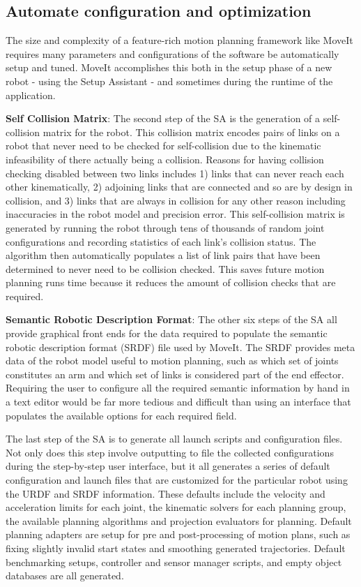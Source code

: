 \documentclass[10pt,journal,compsoc]{joser1}
\begin{document}
{\subsection{Automate configuration and optimization}

The size and complexity of a feature-rich motion planning framework like MoveIt requires many parameters and configurations of the software be automatically setup and tuned. MoveIt accomplishes this both in the setup phase of a new robot - using the Setup Assistant - and sometimes during the runtime of the application.

{\bf Self Collision Matrix}: The second step of the SA is the generation of a self-collision matrix for the robot. This collision matrix encodes pairs of links on a robot that never need to be checked for self-collision due to the kinematic infeasibility of there actually being a collision. Reasons for having collision checking disabled between two links includes 1) links that can never reach each other kinematically, 2) adjoining links that are connected and so are by design in collision, and 3) links that are always in collision for any other reason including inaccuracies in the robot model and precision error. This self-collision matrix is generated by running the robot through tens of thousands of random joint configurations and recording statistics of each link's collision status. The algorithm then automatically populates a list of link pairs that have been determined to never need to be collision checked. This saves future motion planning runs time because it reduces the amount of collision checks that are required.

{\bf Semantic Robotic Description Format}: The other six steps of the SA all provide graphical front ends for the data required to populate the semantic robotic description format (SRDF) file used by MoveIt. The SRDF provides meta data of the robot model useful to motion planning, such as which set of joints constitutes an arm and which set of links is considered part of the end effector. Requiring the user to configure all the required semantic information by hand in a text editor would be far more tedious and difficult than using an interface that populates the available options for each required field.

The last step of the SA is to generate all launch scripts and configuration files. Not only does this step involve outputting to file the collected configurations during the step-by-step user interface, but it all generates a series of default configuration and launch files that are customized for the particular robot using the URDF and SRDF information. These defaults include the velocity and acceleration limits for each joint, the kinematic solvers for each planning group, the available planning algorithms and projection evaluators for planning. Default planning adapters are setup for pre and post-processing of motion plans, such as fixing slightly invalid start states and smoothing generated trajectories. Default benchmarking setups, controller and sensor manager scripts, and empty object databases are all generated. 

}
\end{document}
